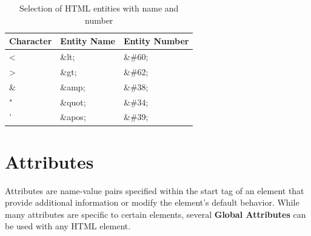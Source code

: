 \documentclass{scrbook}
\begin{document}
\begin{table}[h!]
    \centering
    \begin{tabularx}{\textwidth}{|X|X|X|} \hline
        \textbf{Character} & \textbf{Entity Name} & \textbf{Entity Number} \\ \hline

        \textless & \&lt; & \&\#60; \\
        \hline

        \textgreater & \&gt; & \&\#62; \\
        \hline

        \& & \&amp; & \&\#38; \\
        \hline

        " & \&quot; & \&\#34; \\
        \hline

        ' & \&apos; & \&\#39; \\
        \hline
    \end{tabularx}
    \caption{Selection of HTML entities with name and number}
\end{table}

\section{Attributes}

Attributes are name-value pairs specified within the start tag of an element that provide additional information or modify the element's default behavior. While many attributes are specific to certain elements, several \textbf{Global Attributes} can be used with any HTML element.
\end{document}
